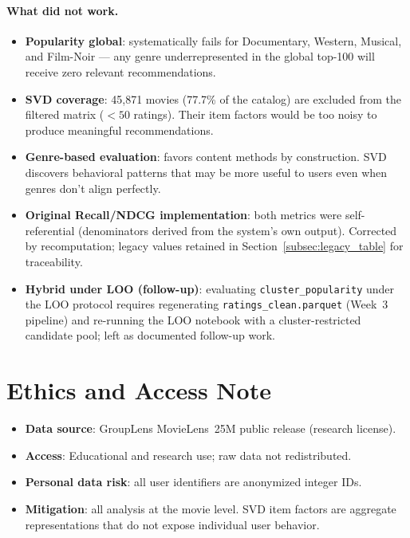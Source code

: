 \documentclass[12pt,a4paper]{article}
\begin{document}
\paragraph{What did not work.}
\begin{itemize}[nosep]
  \item \textbf{Popularity global}: systematically fails for Documentary, Western, Musical,
    and Film-Noir --- any genre underrepresented in the global top-100 will receive zero
    relevant recommendations.
  \item \textbf{SVD coverage}: 45,871 movies (77.7\% of the catalog) are excluded from the
    filtered matrix ($<50$ ratings). Their item factors would be too noisy to produce
    meaningful recommendations.
  \item \textbf{Genre-based evaluation}: favors content methods by construction. SVD discovers
    behavioral patterns that may be more useful to users even when genres don't align perfectly.
  \item \textbf{Original Recall/NDCG implementation}: both metrics were self-referential
    (denominators derived from the system's own output). Corrected by recomputation; legacy
    values retained in Section~\ref{subsec:legacy_table} for traceability.
  \item \textbf{Hybrid under LOO (follow-up)}: evaluating \texttt{cluster\_popularity} under
    the LOO protocol requires regenerating \texttt{ratings\_clean.parquet} (Week~3 pipeline)
    and re-running the LOO notebook with a cluster-restricted candidate pool; left as
    documented follow-up work.
\end{itemize}

\section{Ethics and Access Note}

\begin{itemize}[nosep]
  \item \textbf{Data source}: GroupLens MovieLens~25M public release (research license).
  \item \textbf{Access}: Educational and research use; raw data not redistributed.
  \item \textbf{Personal data risk}: all user identifiers are anonymized integer IDs.
  \item \textbf{Mitigation}: all analysis at the movie level.
    SVD item factors are aggregate representations that do not expose individual user behavior.
\end{itemize}
\end{document}
